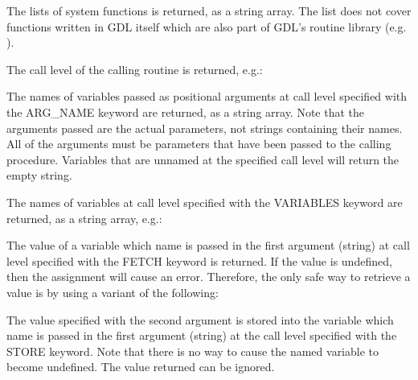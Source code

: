 The lists of system functions is returned, as a string array.
The list does not cover functions written in GDL itself which
are also part of GDL's routine library (e.g. ).

The call level of the calling routine is returned, e.g.:

The names of variables passed as positional arguments at call level specified
with the ARG\_NAME keyword are returned, as a string array.  
Note that the arguments passed are the actual parameters, not strings containing their names.
All of the arguments must be parameters that have been passed to the calling procedure.  
Variables that are unnamed at the specified call level will return the empty string.

The names of variables at call level specified with the VARIABLES keyword are returned,
as a string array, e.g.:

%
%
The value of a variable which name is passed in the first argument (string) 
at call level specified with the FETCH keyword is returned.  
If the value is undefined, then the assignment will cause an error.  
Therefore, the only safe way to retrieve a value is by using a variant of the following:

The value specified with the second argument is stored into the variable 
which name is passed in the first argument (string) at
the call level specified with the STORE keyword.  
Note that there is no way to cause the named variable to become undefined.  
The value returned can be ignored.

